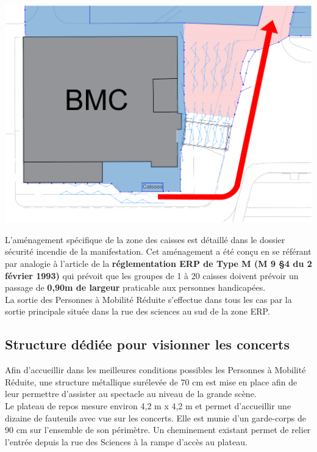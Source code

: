 \documentclass[hidelinks, paper=a4, fontsize=13pt]{report}
\begin{document}
\begin{center}
\includegraphics[width=.8\textwidth,keepaspectratio]{Exports/Plan_24h_44eme-Entree_PMR}
\end{center}

L’aménagement spécifique de la zone des caisses est détaillé dans le dossier sécurité incendie de la manifestation. Cet aménagement a été conçu en se référant par analogie à l’article de la \textbf{réglementation ERP de Type M (M 9 §4 du 2 février 1993)} qui prévoit que les groupes de 1 à 20 caisses doivent prévoir un passage de \textbf{0,90m de largeur} praticable aux personnes handicapées. \\

La sortie des Personnes à Mobilité Réduite s’effectue dans tous les cas par la sortie principale située dans la rue des sciences au sud de la zone ERP.

\subsection{Structure dédiée pour visionner les concerts}

Afin d’accueillir dans les meilleures conditions possibles les Personnes à Mobilité Réduite, une structure métallique surélevée de 70 cm est mise en place afin de leur permettre d’assister au spectacle au niveau de la grande scène.\\

Le plateau de repos mesure environ 4,2 m x 4,2 m et permet d’accueillir une dizaine de fauteuils avec vue sur les concerts. Elle est munie d’un garde-corps de 90 cm sur l’ensemble de son périmètre. 
Un cheminement existant permet de relier l'entrée depuis la rue des Sciences à la rampe d'accès au plateau.\\
\end{document}

